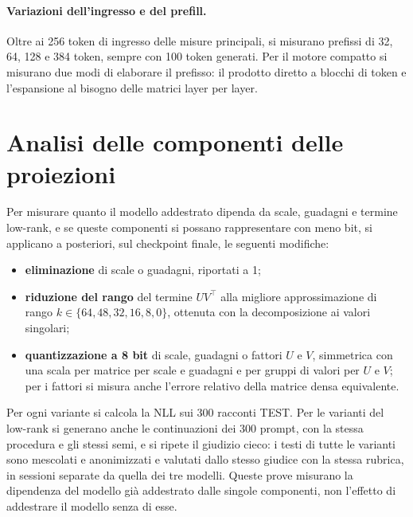 \paragraph{Variazioni dell'ingresso e del prefill.} Oltre ai 256 token di ingresso delle misure principali, si misurano prefissi di 32, 64, 128 e 384 token, sempre con 100 token generati. Per il motore compatto si misurano due modi di elaborare il prefisso: il prodotto diretto a blocchi di token e l'espansione al bisogno delle matrici layer per layer.

\section{Analisi delle componenti delle proiezioni}
\label{sec:metodo-componenti}

Per misurare quanto il modello addestrato dipenda da scale, guadagni e termine low-rank, e se queste componenti si possano rappresentare con meno bit, si applicano a posteriori, sul checkpoint finale, le seguenti modifiche:
\begin{itemize}
\item \textbf{eliminazione} di scale o guadagni, riportati a 1;
\item \textbf{riduzione del rango} del termine $UV^\top$ alla migliore approssimazione di rango $k\in\{64,48,32,16,8,0\}$, ottenuta con la decomposizione ai valori singolari;
\item \textbf{quantizzazione a 8 bit} di scale, guadagni o fattori $U$ e $V$, simmetrica con una scala per matrice per scale e guadagni e per gruppi di valori per $U$ e $V$; per i fattori si misura anche l'errore relativo della matrice densa equivalente.
\end{itemize}
Per ogni variante si calcola la NLL sui 300 racconti TEST. Per le varianti del low-rank si generano anche le continuazioni dei 300 prompt, con la stessa procedura e gli stessi semi, e si ripete il giudizio cieco: i testi di tutte le varianti sono mescolati e anonimizzati e valutati dallo stesso giudice con la stessa rubrica, in sessioni separate da quella dei tre modelli. Queste prove misurano la dipendenza del modello già addestrato dalle singole componenti, non l'effetto di addestrare il modello senza di esse.
